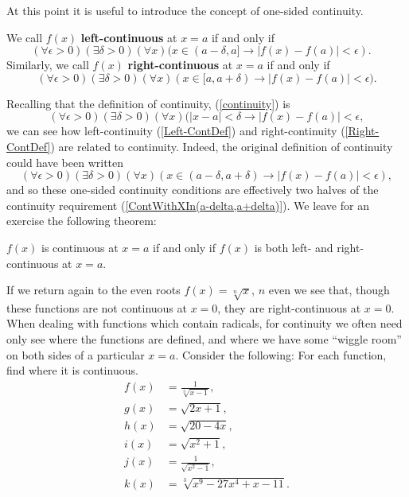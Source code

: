 At this point it is useful to introduce the concept of
one-sided continuity.  

\begin{definition}
We call $f(x)$ {\bf left-continuous} at $x=a$ if and only if
\begin{equation}
(\forall\epsilon>0)(\exists\delta>0)(\forall x)
(x\in(a-\delta,a]\longrightarrow|f(x)-f(a)|<\epsilon).\quad
\label{Left-ContDef}\end{equation}
Similarly, we call $f(x)$ {\bf right-continuous} at $x=a$
if and only if
\begin{equation}
(\forall\epsilon>0)(\exists\delta>0)(\forall x)
(x\in[a,a+\delta)\longrightarrow|f(x)-f(a)|<\epsilon).
\label{Right-ContDef}\end{equation}
\end{definition}
Recalling that the definition of continuity, (\ref{continuity}) is
$$(\forall\epsilon>0)(\exists\delta>0)(\forall x)
  (|x-a|<\delta\longrightarrow|f(x)-f(a)|<\epsilon,$$
we can see how left-continuity (\ref{Left-ContDef}) and 
right-continuity (\ref{Right-ContDef})
are related to continuity.  Indeed,
the original definition of
continuity 
could have been written
\begin{equation}
(\forall\epsilon>0)(\exists\delta>0)(\forall x)
(x\in(a-\delta,a+\delta)\longrightarrow|f(x)-f(a)|<\epsilon),
\label{ContWithXIn(a-delta,a+delta)}\end{equation}
and so these one-sided continuity conditions are
effectively two halves of the continuity requirement
(\ref{ContWithXIn(a-delta,a+delta)}).
We leave for an exercise the following theorem:
\begin{theorem}
 $f(x)$ is continuous at $x=a$ if and only if
$f(x)$ is both left- and right-continuous at $x=a$.
\label{NeedLeftAndRightContinuityForContinuityTheorem}\end{theorem}
If we return again to the even roots $f(x)=\sqrt[n]{x}$,
$n$ even we  see that, though these functions are not
continuous at $x=0$, they are right-continuous at $x=0$.
When dealing with functions which contain radicals, for continuity
we often need only see where the functions are defined, and
where we have some ``wiggle room'' on both sides of a 
particular $x=a$. Consider the following:
\bex For each function, find where it is continuous.
\begin{align*}f(x)&=\frac{1}{\sqrt[3]{x-1}},\\
              g(x)&=\sqrt{2x+1},\\
              h(x)&=\sqrt{20-4x},\\
              i(x)&=\sqrt{x^2+1},\\
              j(x)&=\frac{1}{\sqrt{x^2-1}},\\
              k(x)&=\sqrt[3]{x^9-27x^4+x-11}.\end{align*}


